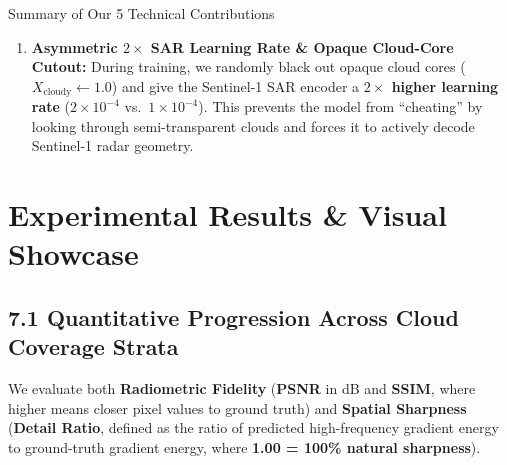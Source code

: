 \documentclass[11pt,a4paper]{article}
\begin{document}
\begin{contribbox}{Summary of Our 5 Technical Contributions}
\begin{enumerate}[leftmargin=1.5em, itemsep=5pt, topsep=2pt]
    \item \textbf{Asymmetric $2\times$ SAR Learning Rate \& Opaque Cloud-Core Cutout:}
    During training, we randomly black out opaque cloud cores ($X_{\text{cloudy}} \leftarrow 1.0$) and give the Sentinel-1 SAR encoder a \textbf{$2\times$ higher learning rate} ($2\times 10^{-4}$ vs.\ $1\times 10^{-4}$). This prevents the model from ``cheating'' by looking through semi-transparent clouds and forces it to actively decode Sentinel-1 radar geometry.
\end{enumerate}
\end{contribbox}

\newpage
\section{Experimental Results \& Visual Showcase}

\subsection{7.1 Quantitative Progression Across Cloud Coverage Strata}
We evaluate both \textbf{Radiometric Fidelity} (\textbf{PSNR} in dB and \textbf{SSIM}, where higher means closer pixel values to ground truth) and \textbf{Spatial Sharpness} (\textbf{Detail Ratio}, defined as the ratio of predicted high-frequency gradient energy to ground-truth gradient energy, where \textbf{1.00 = 100\% natural sharpness}).
\end{document}
